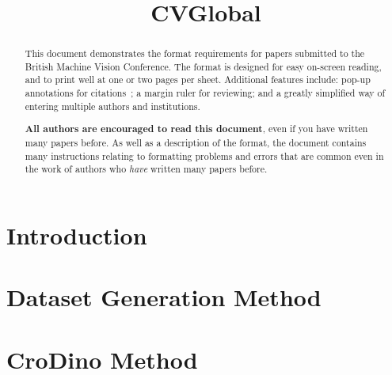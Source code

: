 \documentclass{bmvc2k}
\title{CVGlobal}
\begin{document}
\maketitle

\begin{abstract}
This document demonstrates the format requirements for papers submitted
to the British Machine Vision Conference.  The format is designed for
easy on-screen reading, and to print well at one or two pages per sheet.
Additional features include: pop-up annotations for
citations~\cite{Authors06,Mermin89}; a margin ruler for reviewing; and a
greatly simplified way of entering multiple authors and institutions.

{\bf All authors are encouraged to read this document}, even if you have
written many papers before.  As well as a description of the format, the
document contains many instructions relating to formatting problems and
errors that are common even in the work of authors who {\em have}
written many papers before.
\end{abstract}

\section{Introduction}
\label{sec:intro}


\section{Dataset Generation Method}
\label{sec:dataset_generation}


\section{CroDino Method}
\label{sec:method}



\end{document}
